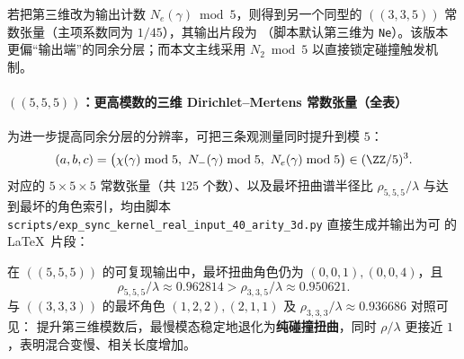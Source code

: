 \begin{remark}\label{rem:arity-335-ne-mod5}
若把第三维改为输出计数 $N_e(\gamma)\bmod 5$，则得到另一个同型的 $((3,3,5))$ 常数张量（主项系数同为 $1/45$），其输出片段为
\verb||
（脚本默认第三维为 \texttt{Ne}）。该版本更偏“输出端”的同余分层；而本文主线采用 $N_2\bmod 5$ 以直接锁定碰撞触发机制。
\end{remark}

\paragraph{\texorpdfstring{$((5,5,5))$}{(5,5,5)}：更高模数的三维 Dirichlet--Mertens 常数张量（全表）}
为进一步提高同余分层的分辨率，可把三条观测量同时提升到模 $5$：
$$
(a,b,c)=\bigl(\chi(\gamma)\bmod 5,\ N_-(\gamma)\bmod 5,\ N_e(\gamma)\bmod 5\bigr)\in(\ZZ/5)^3.
$$
对应的 $5\times 5\times 5$ 常数张量（共 $125$ 个数）、以及最坏扭曲谱半径比 $\rho_{5,5,5}/\lambda$ 与达到最坏的角色索引，均由脚本
\texttt{scripts/exp\_sync\_kernel\_real\_input\_40\_arity\_3d.py}
直接生成并输出为可 \verb|| 的 \LaTeX\ 片段：


\begin{remark}[纯碰撞慢模的普适性与混合变慢]\label{cor:arity-555-collision-universal}
在 $((5,5,5))$ 的可复现输出中，最坏扭曲角色仍为 $(0,0,1),(0,0,4)$，且
\[
\rho_{5,5,5}/\lambda\approx 0.962814> \rho_{3,3,5}/\lambda\approx 0.950621.
\]
与 $((3,3,3))$ 的最坏角色 $(1,2,2),(2,1,1)$ 及 $\rho_{3,3,3}/\lambda\approx 0.936686$ 对照可见：
提升第三维模数后，最慢模态稳定地退化为\textbf{纯碰撞扭曲}，同时 $\rho/\lambda$ 更接近 $1$，表明混合变慢、相关长度增加。
\end{remark}

